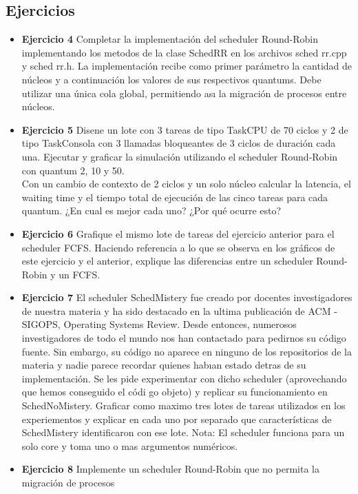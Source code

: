 
\subsection{Ejercicios}
\begin{itemize}
 \item 
\textbf{Ejercicio 4}  Completar la implementación del scheduler Round-Robin implementando los
metodos de la clase SchedRR en los archivos sched rr.cpp y sched rr.h. La implementaci\'{o}n
recibe como primer par\'{a}metro la cantidad de n\'{u}cleos y a continuaci\'{o}n los valores de sus
respectivos quantums. Debe utilizar una \'{u}nica cola global, permitiendo ası la migraci\'{o}n de
procesos entre n\'{u}cleos.
\item \textbf{Ejercicio 5} Disene un lote con 3 tareas de tipo TaskCPU de 70 ciclos y 2 de tipo TaskConsola
con 3 llamadas bloqueantes de 3 ciclos de duraci\'{o}n cada una. Ejecutar y graficar la simulaci\'{o}n
utilizando el scheduler Round-Robin con quantum 2, 10 y 50.\\
Con un cambio de contexto de 2 ciclos y un solo n\'{u}cleo calcular la latencia, el waiting
time y el tiempo total de ejecuci\'{o}n de las cinco tareas para cada quantum. 
¿En cual es mejor cada uno? ¿Por qu\'{e} ocurre esto?
\item \textbf{Ejercicio 6} Grafique el mismo lote de tareas del ejercicio anterior para el scheduler FCFS.
Haciendo referencia a lo que se observa en los gr\'{a}ficos de este ejercicio y el anterior, explique
las diferencias entre un scheduler Round-Robin y un FCFS.
\item \textbf{Ejercicio 7} El scheduler SchedMistery fue creado por docentes investigadores de nuestra
materia y ha sido destacado en la ultima publicaci\'{o}n de ACM - SIGOPS, Operating Systems
Review. Desde entonces, numerosos investigadores de todo el mundo nos han contactado para
pedirnos su c\'{o}digo fuente. Sin embargo, su c\'{o}digo no aparece en ninguno de los repositorios
de la materia y nadie parece recordar quienes habıan estado detras de su implementaci\'{o}n.
Se les pide experimentar con dicho scheduler (aprovechando que hemos conseguido el c\'{o}di
go objeto) y replicar su funcionamiento en SchedNoMistery. Graficar como maximo tres lotes
de tareas utilizados en los experiementos y explicar en cada uno por separado que caracter\'{i}sticas
de SchedMistery identificaron con ese lote. Nota: El scheduler funciona para un solo
core y toma uno o mas argumentos num\'{e}ricos.
\item \textbf{Ejercicio 8} Implemente un scheduler Round-Robin que no permita la migraci\'{o}n de procesos

\end{itemize}
